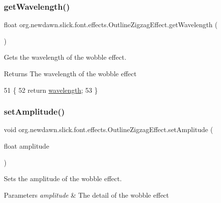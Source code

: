 \subsubsection{\texorpdfstring{get\+Wavelength()}{getWavelength()}}
{\footnotesize\ttfamily float org.\+newdawn.\+slick.\+font.\+effects.\+Outline\+Zigzag\+Effect.\+get\+Wavelength (\begin{DoxyParamCaption}{ }\end{DoxyParamCaption})\hspace{0.3cm}{\ttfamily [inline]}}

Gets the wavelength of the wobble effect.

\begin{DoxyReturn}{Returns}
The wavelength of the wobble effect 
\end{DoxyReturn}

\begin{DoxyCode}
51                                  \{
52         \textcolor{keywordflow}{return} \mbox{\hyperlink{classorg_1_1newdawn_1_1slick_1_1font_1_1effects_1_1_outline_zigzag_effect_a4393ec4437b469ea2855c70deec82d09}{wavelength}};
53     \}
\end{DoxyCode}
\mbox{\label{classorg_1_1newdawn_1_1slick_1_1font_1_1effects_1_1_outline_zigzag_effect_a4b16a0c068d2c9e3319b5acf3c39ac0a}} 
\subsubsection{\texorpdfstring{set\+Amplitude()}{setAmplitude()}}
{\footnotesize\ttfamily void org.\+newdawn.\+slick.\+font.\+effects.\+Outline\+Zigzag\+Effect.\+set\+Amplitude (\begin{DoxyParamCaption}\item[{float}]{amplitude }\end{DoxyParamCaption})\hspace{0.3cm}{\ttfamily [inline]}}

Sets the amplitude of the wobble effect.


\begin{DoxyParams}{Parameters}
{\em amplitude} & The detail of the wobble effect \\
\hline
\end{DoxyParams}

